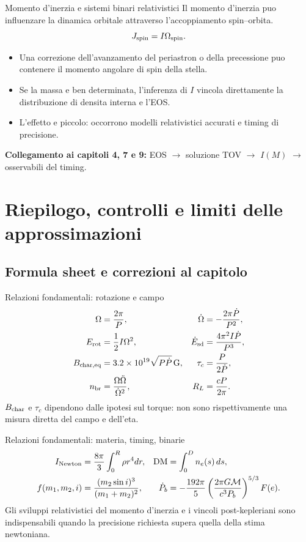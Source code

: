 \begin{frame}[t]{Momento d'inerzia e sistemi binari relativistici}
\small
Il momento d'inerzia puo influenzare la dinamica orbitale attraverso l'accoppiamento spin--orbita.
\[
J_{\rm spin}=I\Omega_{\rm spin}.
\]
\begin{itemize}
\item Una correzione dell'avanzamento del periastron o della precessione puo contenere il momento angolare di spin della stella.
\item Se la massa e ben determinata, l'inferenza di $I$ vincola direttamente la distribuzione di densita interna e l'EOS.
\item L'effetto e piccolo: occorrono modelli relativistici accurati e timing di precisione.
\end{itemize}
\textbf{Collegamento ai capitoli 4, 7 e 9:} EOS $\to$ soluzione TOV $\to$ $I(M)$ $\to$ osservabili del timing.
\end{frame}

\section{Riepilogo, controlli e limiti delle approssimazioni}

\subsection{Formula sheet e correzioni al capitolo}

\begin{frame}[t]{Relazioni fondamentali: rotazione e campo}
\small
\begin{align*}
\Omega&=\frac{2\pi}P,& \dot\Omega&=-\frac{2\pi\dot P}{P^2},\\
E_{\rm rot}&=\frac12 I\Omega^2,&
\dot E_{\rm sd}&=\frac{4\pi^2I\dot P}{P^3},\\
B_{\rm char,eq}&=3.2\times10^{19}\sqrt{P\dot P}\,\mathrm G,&
\tau_c&=\frac P{2\dot P},\\
n_{\rm br}&=\frac{\Omega\ddot\Omega}{\dot\Omega^2},&
R_L&=\frac{cP}{2\pi}.
\end{align*}
\medskip
$B_{\rm char}$ e $\tau_c$ dipendono dalle ipotesi sul torque: non sono rispettivamente una misura diretta del campo e dell'eta.
\end{frame}

\begin{frame}[t]{Relazioni fondamentali: materia, timing, binarie}
\small
\begin{align*}
I_{\rm Newton}&=\frac{8\pi}{3}\int_0^R\rho r^4dr,&
\mathrm{DM}&=\int_0^Dn_e(s)\,ds,\\
f(m_1,m_2,i)&=\frac{(m_2\sin i)^3}{(m_1+m_2)^2},&
\dot P_b&=-\frac{192\pi}{5}\left(\frac{2\pi G\mathcal M}{c^3P_b}\right)^{5/3}F(e).
\end{align*}
\medskip
Gli sviluppi relativistici del momento d'inerzia e i vincoli post-kepleriani sono indispensabili quando la precisione richiesta supera quella della stima newtoniana.
\end{frame}

